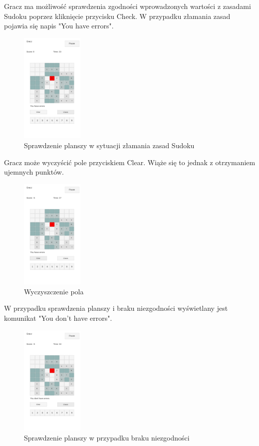 \documentclass[a4paper, 11pt]{article}
\begin{document}
Gracz ma możliwość sprawdzenia zgodności wprowadzonych wartości z zasadami Sudoku poprzez kliknięcie przycisku Check. W przypadku złamania zasad pojawia się napis "You have errors".
\begin{figure}[H]
	\centering
	\includegraphics[width=3cm]{zrzuty/7.png}
	\caption{Sprawdzenie planszy w sytuacji złamania zasad Sudoku}
	\label{fig:check_errors}
\end{figure}
Gracz może wyczyścić pole przyciskiem Clear. Wiąże się to jednak z otrzymaniem ujemnych punktów.
\begin{figure}[H]
	\centering
	\includegraphics[width=3cm]{zrzuty/8.png}
	\caption{Wyczyszczenie pola}
	\label{fig:clear}
\end{figure}
W przypadku sprawdzenia planszy i braku niezgodności wyświetlany jest komunikat "You don't have errors".
\begin{figure}[H]
	\centering
	\includegraphics[width=3cm]{zrzuty/9.png}
	\caption{Sprawdzenie planszy w przypadku braku niezgodności}
	\label{fig:check_ok}
\end{figure}
\end{document}
